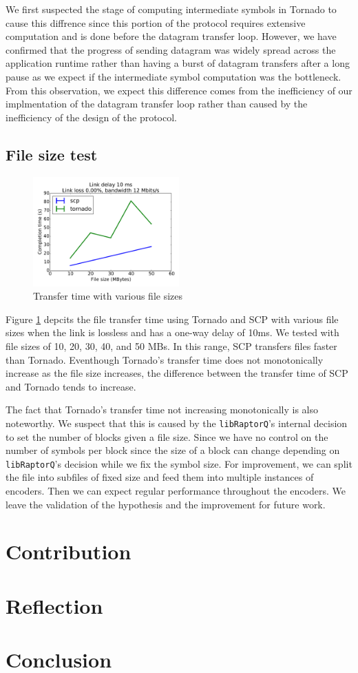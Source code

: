 \documentclass{sig-alternate-10pt}
\begin{document}
We first suspected the stage of computing intermediate symbols in Tornado to
cause this diffrence since this portion of the protocol requires extensive
computation and is done before the datagram transfer loop.  However, we have
confirmed that the progress of sending datagram was widely spread across the
application runtime rather than having a burst of datagram transfers after a
long pause as we expect if the intermediate symbol computation was the
bottleneck. From this observation, we expect this difference comes from the
inefficiency of our implmentation of the datagram transfer loop rather than
caused by the inefficiency of the design of the protocol.

\subsection{File size test}

\begin{figure}[t]
  \centering
  \includegraphics[width=0.5\textwidth]{filesize-plot}
  \caption{Transfer time with various file sizes}
  \label{f:filesize-plot}
\end{figure}

Figure \ref{f:filesize-plot} depcits the file transfer time using Tornado and
SCP with various file sizes when the link is lossless and has a one-way delay of
10ms. We tested with file sizes of 10, 20, 30, 40, and 50 MBs. In this range,
SCP transfers files faster than Tornado. Eventhough Tornado's transfer time does
not monotonically increase as the file size increases, the difference between
the transfer time of SCP and Tornado tends to increase.

The fact that Tornado's transfer time not increasing monotonically is also
noteworthy. We suspect that this is caused by the \texttt{libRaptorQ}'s internal
decision to set the number of blocks given a file size. Since we have no control
on the number of symbols per block since the size of a block can change
depending on \texttt{libRaptorQ}'s decision while we fix the symbol size. For
improvement, we can split the file into subfiles of fixed size and feed them
into multiple instances of encoders. Then we can expect regular performance
throughout the encoders. We leave the validation of the hypothesis and the
improvement for future work.

\section{Contribution}

\section{Reflection}

\section{Conclusion}




\end{document}
